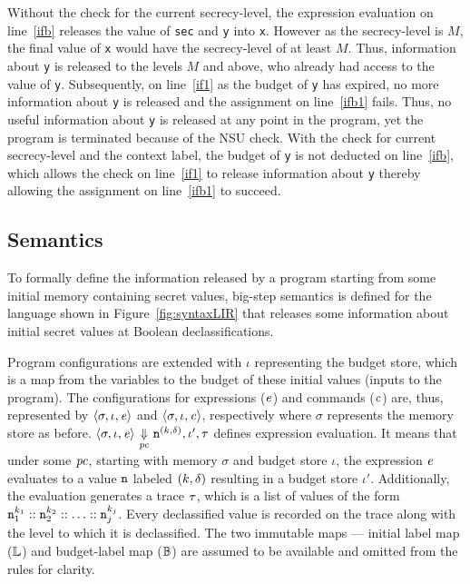 Without the check for the current secrecy-level, the
expression evaluation on line~\ref{ifb} releases the value of 
\texttt{sec} and \texttt{y} into \texttt{x}. However as the
secrecy-level is $M$, the final value of \texttt{x} would have the
secrecy-level of at least $M$. Thus, information about \texttt{y} is
released to the levels $M$ and above, who already had access to the
value of \texttt{y}. Subsequently, on line~\ref{if1} as the budget of
\texttt{y} has expired, no more information about \texttt{y} is
released and the assignment on line~\ref{ifb1} fails. Thus, no useful
information about \texttt{y} is released at any point in the program,
yet the program is terminated because of the NSU check. With the check 
for current secrecy-level and the context label, the budget of
\texttt{y} is not deducted on line~\ref{ifb}, which allows the check
on line~\ref{if1} to release information about \texttt{y} 
thereby allowing the assignment on line~\ref{ifb1} to succeed.


\subsection{Semantics}
\label{sec:semantics}
To formally define the information released by a program starting from some
initial memory containing secret values, big-step semantics is defined
for the language shown in Figure~\ref{fig:syntaxLIR} that releases
some information about initial secret values at Boolean declassifications.

Program configurations are extended with $\iota$ representing the
budget store, which is a map from the variables to the budget of these
initial  values (inputs to the program). The configurations for
expressions ($\mathit{e}$) and commands ($\mathit{c}$) are, thus, represented
by $\langle \sigma, \iota, \mathit{e} \rangle$ and $\langle \sigma, \iota, 
\mathit{c} \rangle$, respectively where $\sigma$ represents the memory
store as before. 
$\langle\sigma, \iota, \mathit{e} \rangle {~\underset{\mathit{pc}}{\Downarrow}~} \texttt{n}^{(k, \delta)}, \iota',
\tau$ defines expression evaluation. It means that under some
$\mathit{pc}$, starting with memory $\sigma$ and budget store $\iota$, the
expression $\mathit{e}$ evaluates to a value $\texttt{n}$ labeled
$(k, \delta)$ resulting in a budget store $\iota'$. Additionally, the
evaluation generates a trace $\tau$, which is a list of values of the
form $\texttt{n}_1^{k_1} :: \texttt{n}_2^{k_2} :: \ldots ::
\texttt{n}_j^{k_j}$. Every declassified value is recorded on the trace along
with the level to which it is declassified. The two immutable maps ---
initial label map ($\mathbb{L}$) and budget-label map ($\mathbb{B}$) are
assumed to be available and omitted from the rules for clarity.

